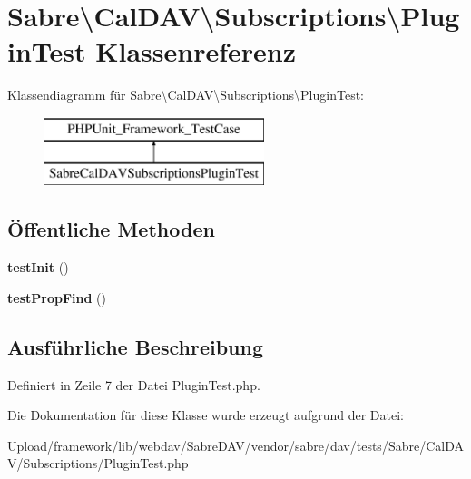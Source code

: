 \hypertarget{class_sabre_1_1_cal_d_a_v_1_1_subscriptions_1_1_plugin_test}{}\section{Sabre\textbackslash{}Cal\+D\+AV\textbackslash{}Subscriptions\textbackslash{}Plugin\+Test Klassenreferenz}
\label{class_sabre_1_1_cal_d_a_v_1_1_subscriptions_1_1_plugin_test}
Klassendiagramm für Sabre\textbackslash{}Cal\+D\+AV\textbackslash{}Subscriptions\textbackslash{}Plugin\+Test\+:\begin{figure}[H]
\begin{center}
\leavevmode
\includegraphics[height=2.000000cm]{class_sabre_1_1_cal_d_a_v_1_1_subscriptions_1_1_plugin_test}
\end{center}
\end{figure}
\subsection*{Öffentliche Methoden}
\begin{DoxyCompactItemize}
\item 
\mbox{\label{class_sabre_1_1_cal_d_a_v_1_1_subscriptions_1_1_plugin_test_a1cb4f4062910423a41aa198b0aa4b6e8}} 
{\bfseries test\+Init} ()
\item 
\mbox{\label{class_sabre_1_1_cal_d_a_v_1_1_subscriptions_1_1_plugin_test_a770953a29dd60d2e362ec7dfd2a016f9}} 
{\bfseries test\+Prop\+Find} ()
\end{DoxyCompactItemize}


\subsection{Ausführliche Beschreibung}


Definiert in Zeile 7 der Datei Plugin\+Test.\+php.



Die Dokumentation für diese Klasse wurde erzeugt aufgrund der Datei\+:\begin{DoxyCompactItemize}
\item 
Upload/framework/lib/webdav/\+Sabre\+D\+A\+V/vendor/sabre/dav/tests/\+Sabre/\+Cal\+D\+A\+V/\+Subscriptions/Plugin\+Test.\+php\end{DoxyCompactItemize}
